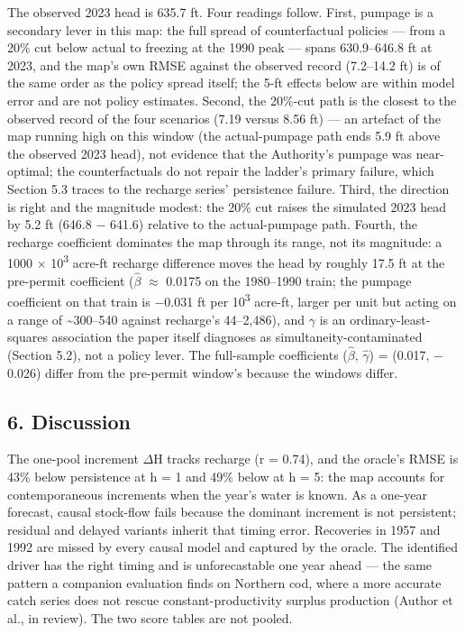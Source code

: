 \documentclass[11pt]{article}
\begin{document}
The observed 2023 head is 635.7 ft. Four readings follow. First, pumpage
is a secondary lever in this map: the full spread of counterfactual
policies --- from a 20\% cut below actual to freezing at the 1990 peak
--- spans 630.9--646.8 ft at 2023, and the map's own RMSE against the
observed record (7.2--14.2 ft) is of the same order as the policy spread
itself; the 5-ft effects below are within model error and are not policy
estimates. Second, the 20\%-cut path is the closest to the observed
record of the four scenarios (7.19 versus 8.56 ft) --- an artefact of
the map running high on this window (the actual-pumpage path ends 5.9 ft
above the observed 2023 head), not evidence that the Authority's pumpage
was near-optimal; the counterfactuals do not repair the ladder's primary
failure, which Section 5.3 traces to the recharge series' persistence
failure. Third, the direction is right and the magnitude modest: the
20\% cut raises the simulated 2023 head by 5.2 ft (646.8 \ensuremath{-} 641.6)
relative to the actual-pumpage path. Fourth, the recharge coefficient
dominates the map through its range, not its magnitude: a 1000 \ensuremath{\times} 10\textsuperscript{3}
acre-ft recharge difference moves the head by roughly 17.5 ft at the
pre-permit coefficient (\(\hat{\beta}\) \ensuremath{\approx} 0.0175 on the 1980--1990 train; the pumpage
coefficient on that train is \ensuremath{-}0.031 ft per 10\textsuperscript{3} acre-ft, larger per unit
but acting on a range of \textasciitilde300--540 against recharge's
44--2,486), and \ensuremath{\gamma} is an ordinary-least-squares association the paper
itself diagnoses as simultaneity-contaminated (Section 5.2), not a
policy lever. The full-sample coefficients (\(\hat{\beta}\), \(\hat{\gamma}\)) = (0.017, \ensuremath{-}0.026)
differ from the pre-permit window's because the windows differ.

\subsection{6. Discussion}\label{discussion}

The one-pool increment \ensuremath{\Delta}H tracks recharge (r = 0.74), and the oracle's
RMSE is 43\% below persistence at h = 1 and 49\% below at h = 5: the map
accounts for contemporaneous increments when the year's water is known.
As a one-year forecast, causal stock-flow fails because the dominant
increment is not persistent; residual and delayed variants inherit that
timing error. Recoveries in 1957 and 1992 are missed by every causal
model and captured by the oracle. The identified driver has the right
timing and is unforecastable one year ahead --- the same pattern a
companion evaluation finds on Northern cod, where a more accurate catch
series does not rescue constant-productivity surplus production (Author
et al., in review). The two score tables are not pooled.
\end{document}

